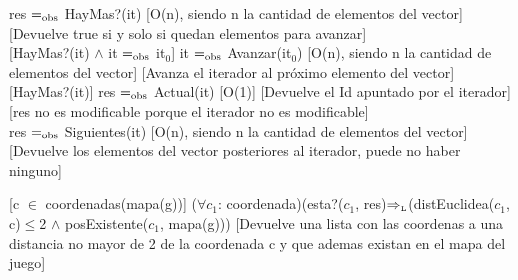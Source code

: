 {res $=_{\mathrm{obs}}$ HayMas?(it)}
[O(n), siendo n la cantidad de elementos del vector]
[Devuelve true si y solo si quedan elementos para avanzar]\\

[HayMas?(it) $\wedge$ it $=_{\mathrm{obs}}$ it$_0$]
{it $=_{\mathrm{obs}}$ Avanzar(it$_0$)}
[O(n), siendo n la cantidad de elementos del vector]
[Avanza el iterador al próximo elemento del vector]\\

[HayMas?(it)]
{res $=_{\mathrm{obs}}$ Actual(it)}
[O(1)]
[Devuelve el Id apuntado por el iterador]
[res no es modificable porque el iterador no es modificable]\\

{res $=_{\mathrm{obs}}$ Siguientes(it)}
[O(n), siendo n la cantidad de elementos del vector]
[Devuelve los elementos del vector posteriores al iterador, puede no haber ninguno]\\


[c $\in$ coordenadas(mapa(g))]
{($\forall c_1$: coordenada)(esta?($c_1$, res)$\Rightarrow_{\mathrm{\scriptscriptstyle{L}}}$(distEuclidea($c_1$, c)$\leq$2  $\wedge$ posExistente($c_1$, mapa(g)))}
[Devuelve una lista con las coordenas a una distancia no mayor de 2 de la coordenada c y que ademas existan en el mapa del juego]

